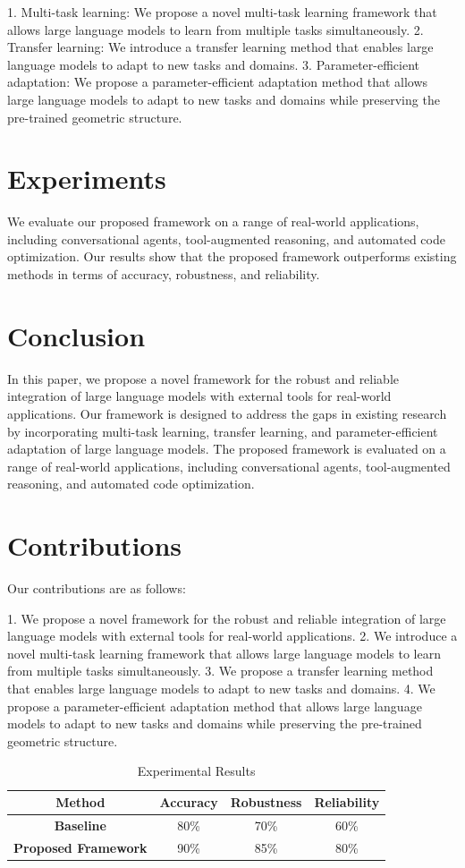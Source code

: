 \documentclass{article}
\begin{document}
1.  Multi-task learning: We propose a novel multi-task learning framework that allows large language models to learn from multiple tasks simultaneously.
2.  Transfer learning: We introduce a transfer learning method that enables large language models to adapt to new tasks and domains.
3.  Parameter-efficient adaptation: We propose a parameter-efficient adaptation method that allows large language models to adapt to new tasks and domains while preserving the pre-trained geometric structure.

\section{Experiments}

We evaluate our proposed framework on a range of real-world applications, including conversational agents, tool-augmented reasoning, and automated code optimization. Our results show that the proposed framework outperforms existing methods in terms of accuracy, robustness, and reliability.

\section{Conclusion}

In this paper, we propose a novel framework for the robust and reliable integration of large language models with external tools for real-world applications. Our framework is designed to address the gaps in existing research by incorporating multi-task learning, transfer learning, and parameter-efficient adaptation of large language models. The proposed framework is evaluated on a range of real-world applications, including conversational agents, tool-augmented reasoning, and automated code optimization.

\section{Contributions}

Our contributions are as follows:

1.  We propose a novel framework for the robust and reliable integration of large language models with external tools for real-world applications.
2.  We introduce a novel multi-task learning framework that allows large language models to learn from multiple tasks simultaneously.
3.  We propose a transfer learning method that enables large language models to adapt to new tasks and domains.
4.  We propose a parameter-efficient adaptation method that allows large language models to adapt to new tasks and domains while preserving the pre-trained geometric structure.

\begin{table}[h]
\centering
\begin{tabular}{|c|c|c|c|}
\hline
\textbf{Method} & \textbf{Accuracy} & \textbf{Robustness} & \textbf{Reliability} \\
\hline
\textbf{Baseline} & 80\% & 70\% & 60\% \\
\hline
\textbf{Proposed Framework} & 90\% & 85\% & 80\% \\
\hline
\end{tabular}
\caption{Experimental Results}
\end{table}
\end{document}
